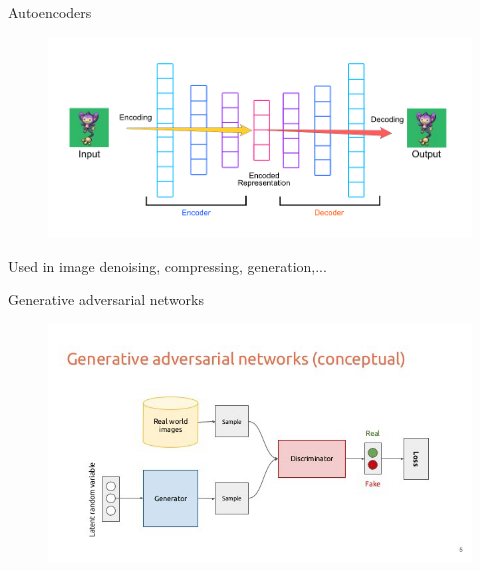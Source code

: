 \documentclass[handout]{beamer}
\begin{document}
\begin{frame}{Autoencoders}
    \begin{figure}
        \centering
        \includegraphics[width=.9\textwidth]{fig/L2/AE.png}

    \end{figure}
\alert{Used in image denoising, compressing, generation,...}
    
\end{frame}

\begin{frame}{Generative adversarial networks}
    \begin{figure}
        \centering
    \includegraphics[width=.9\textwidth]{fig/L2/GAN.png}
  \end{figure}
    
\end{frame}
\end{document}
